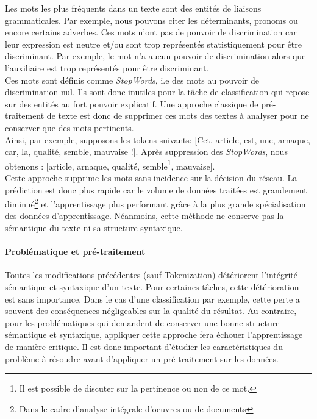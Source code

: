 \noindent Les mots les plus fréquents dans un texte sont des entités de liaisons grammaticales. Par exemple, nous pouvons citer les déterminants, pronoms ou encore certains adverbes. Ces mots n'ont pas de pouvoir de discrimination car leur expression est neutre et/ou sont trop représentés statistiquement pour être discriminant. Par exemple, le mot  n'a aucun pouvoir de discrimination alors que l'auxiliaire  est trop représentés pour être discriminant. \\

\noindent Ces mots sont définis comme \textit{StopWords}, i.e des mots au pouvoir de discrimination nul. Ils sont donc inutiles pour la tâche de classification qui repose sur des entités au fort pouvoir explicatif. Une approche classique de pré-traitement de texte est donc de supprimer ces mots des textes à analyser pour ne conserver que des mots pertinents. \\

\noindent Ainsi, par exemple, supposons les tokens suivants: [Cet, article, est, une, arnaque, car, la, qualité, semble, mauvaise !]. Après suppression des \textit{StopWords}, nous obtenons : [article, arnaque, qualité, semble\footnote{Il est possible de discuter sur la pertinence ou non de ce mot.}, mauvaise].\\

\noindent Cette approche supprime les mots sans incidence sur la décision du réseau. La prédiction est donc plus rapide car le volume de données traitées est grandement diminué\footnote{Dans le cadre d'analyse intégrale d'oeuvres ou de documents} et l'apprentissage plus performant grâce à la plus grande spécialisation des données d'apprentissage. Néanmoins, cette méthode ne conserve pas la sémantique du texte ni sa structure syntaxique.

\paragraph{Problématique et pré-traitement}
Toutes les modifications précédentes (sauf Tokenization) détériorent l'intégrité sémantique et syntaxique d'un texte. Pour certaines tâches, cette détérioration est sans importance. Dans le cas d'une classification par exemple, cette perte a souvent des conséquences négligeables sur la qualité du résultat. Au contraire, pour les problématiques qui demandent de conserver une bonne structure sémantique et syntaxique, appliquer cette approche fera échouer l'apprentissage de manière critique. Il est donc important d'étudier les caractéristiques du problème à résoudre avant d'appliquer un pré-traitement sur les données.\\

